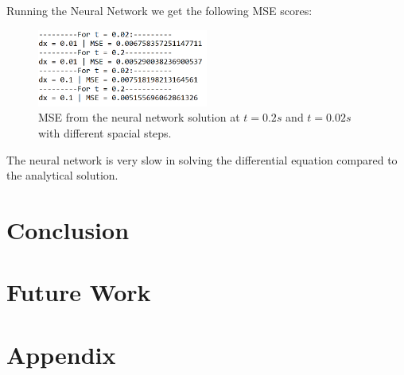 \documentclass[a4paper,11pt,twocolumn]{article}
\begin{document}
Running the Neural Network we get the following MSE scores:

\begin{figure}[h]
	\centering 
	\includegraphics[width=0.5\textwidth]{figures/nnn_mse}
	\caption{MSE from the neural network solution at $t = 0.2s$ and $t = 0.02s$ with different spacial steps.}
	\label{nnmse}
\end{figure}

The neural network is very slow in solving the differential equation compared to the analytical solution. 

\section{Conclusion}


\section{Future Work}

\section{Appendix}
\end{document}
